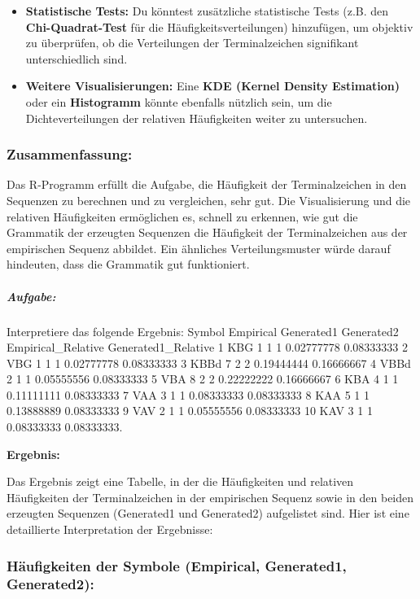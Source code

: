 \documentclass[
]{article}
\begin{document}
\begin{itemize}
\item
  \textbf{Statistische Tests:} Du könntest zusätzliche statistische
  Tests (z.B. den \textbf{Chi-Quadrat-Test} für die
  Häufigkeitsverteilungen) hinzufügen, um objektiv zu überprüfen, ob die
  Verteilungen der Terminalzeichen signifikant unterschiedlich sind.
\item
  \textbf{Weitere Visualisierungen:} Eine \textbf{KDE (Kernel Density
  Estimation)} oder ein \textbf{Histogramm} könnte ebenfalls nützlich
  sein, um die Dichteverteilungen der relativen Häufigkeiten weiter zu
  untersuchen.
\end{itemize}

\subsubsection{\texorpdfstring{\textbf{Zusammenfassung:}}{Zusammenfassung:}}\label{zusammenfassung-1}

Das R-Programm erfüllt die Aufgabe, die Häufigkeit der Terminalzeichen
in den Sequenzen zu berechnen und zu vergleichen, sehr gut. Die
Visualisierung und die relativen Häufigkeiten ermöglichen es, schnell zu
erkennen, wie gut die Grammatik der erzeugten Sequenzen die Häufigkeit
der Terminalzeichen aus der empirischen Sequenz abbildet. Ein ähnliches
Verteilungsmuster würde darauf hindeuten, dass die Grammatik gut
funktioniert.

\subparagraph{\texorpdfstring{
\textbf{Aufgabe:}}{ Aufgabe:}}\label{aufgabe-8}

Interpretiere das folgende Ergebnis:\textquotesingle{} Symbol Empirical
Generated1 Generated2 Empirical\_Relative Generated1\_Relative 1 KBG 1 1
1 0.02777778 0.08333333 2 VBG 1 1 1 0.02777778 0.08333333 3 KBBd 7 2 2
0.19444444 0.16666667 4 VBBd 2 1 1 0.05555556 0.08333333 5 VBA 8 2 2
0.22222222 0.16666667 6 KBA 4 1 1 0.11111111 0.08333333 7 VAA 3 1 1
0.08333333 0.08333333 8 KAA 5 1 1 0.13888889 0.08333333 9 VAV 2 1 1
0.05555556 0.08333333 10 KAV 3 1 1 0.08333333
0.08333333\textquotesingle.

\textbf{Ergebnis:}

Das Ergebnis zeigt eine Tabelle, in der die Häufigkeiten und relativen
Häufigkeiten der Terminalzeichen in der empirischen Sequenz sowie in den
beiden erzeugten Sequenzen (Generated1 und Generated2) aufgelistet sind.
Hier ist eine detaillierte Interpretation der Ergebnisse:

\subsubsection{\texorpdfstring{\textbf{Häufigkeiten der Symbole
(Empirical, Generated1,
Generated2):}}{Häufigkeiten der Symbole (Empirical, Generated1, Generated2):}}\label{huxe4ufigkeiten-der-symbole-empirical-generated1-generated2}
\end{document}
